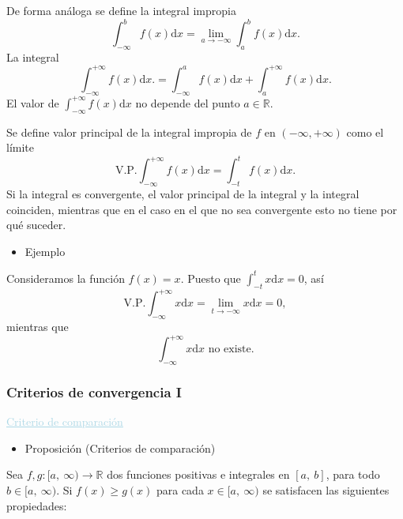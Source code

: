 De forma análoga se define la integral impropia \[ \int_{-\infty}^bf(x)\mathrm{d}x=\lim_{a\to-\infty}\int_a^bf(x)\mathrm{d}x. \]
La integral \[ \int_{-\infty}^{+\infty}f(x)\mathrm{d}x.=\int_{-\infty}^{a}f(x)\mathrm{d}x+\int_{a}^{+\infty}f(x)\mathrm{d}x. \]
El valor de $\int_{-\infty}^{+\infty}f(x)\mathrm{d}x$ no depende del punto $a\in\mathbb{R}$.

Se define valor principal de la integral impropia de $f$ en $(-\infty,+\infty)$ como el límite \[ \mathrm{V.P.}\int_{-\infty}^{+\infty}f(x)\mathrm{d}x=\int_{-t}^{t}f(x)\mathrm{d}x. \]
Si la integral es convergente, el valor principal de la integral y la integral coinciden, mientras que en el caso en el que no sea convergente esto no tiene por qué suceder.
\begin{itemize}[label=\color{red}\textbullet, leftmargin=*]
	\item \color{lightblue}Ejemplo
\end{itemize}
Consideramos la función $f(x)=x$. Puesto que $\int_{-t}^{t}x\mathrm{d}x=0$, así \[ \mathrm{V.P.} \int_{-\infty}^{+\infty}x\mathrm{d}x=\lim_{t\to-\infty}x\mathrm{d}x=0,\] mientras que \[ \int_{-\infty}^{+\infty}x\mathrm{d}x\text{ no existe.} \]
\subsubsection{Criterios de convergencia I}
\textcolor{lightblue}{\underline{Criterio de comparación}}

\begin{itemize}[label=\color{red}\textbullet, leftmargin=*]
	\item \color{lightblue}Proposición (Criterios de comparación)
\end{itemize}
Sea $f,g:[a,~\infty)\rightarrow\mathbb{R}$ dos funciones positivas e integrales en $[a,~b]$, para todo $b\in[a,~\infty)$. Si $f(x)\ge g(x)$ para cada $x\in[a,~\infty)$ se satisfacen las siguientes propiedades:

